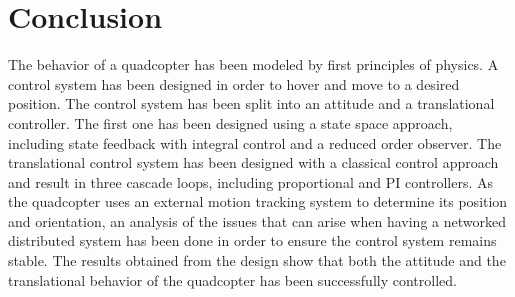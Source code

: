 \section{Conclusion}
The behavior of a quadcopter has been modeled by first principles of physics. A control system has been designed in order to hover and move to a desired position.
The control system has been split into an attitude and a translational controller. The first one has been designed using a state space approach, including state feedback with integral control and a reduced order observer. The translational control system has been designed with a classical control approach and result in three cascade loops, including proportional and PI controllers. 
As the quadcopter uses an external motion tracking system to determine its position and orientation, an analysis of the issues that can arise when having a networked distributed system has been done in order to ensure the control system remains stable. The results obtained from the design show that both the attitude and the translational behavior of the quadcopter has been successfully controlled.

